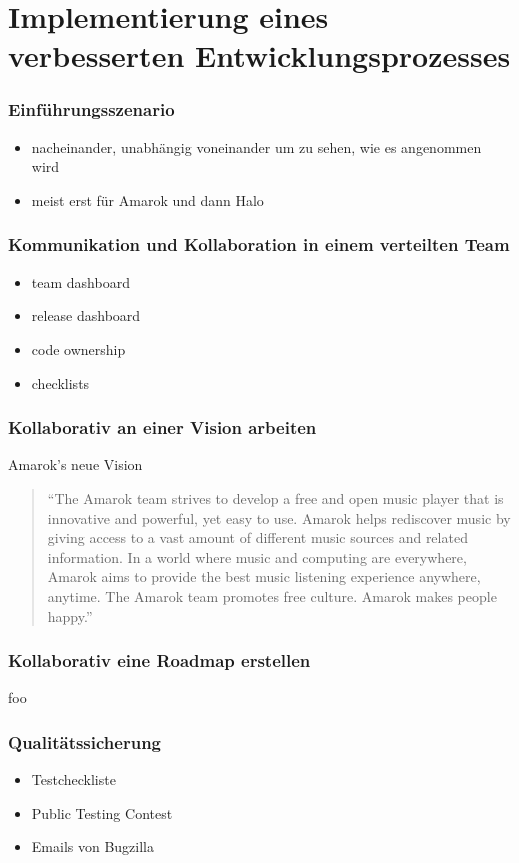 \documentclass{beamer}
\begin{document}
\section{Implementierung eines verbesserten Entwicklungsprozesses}

\begin{frame}
\frametitle{Einf\"uhrungsszenario}
\begin{itemize}
 \item nacheinander, unabh\"angig voneinander um zu sehen, wie es angenommen wird
 \item meist erst f\"ur Amarok und dann Halo
\end{itemize}
\end{frame}

\begin{frame}
\frametitle{Kommunikation und Kollaboration in einem verteilten Team}
\begin{itemize}
 \item team dashboard
 \item release dashboard
 \item code ownership
 \item checklists
\end{itemize}
\end{frame}

\begin{frame}
\frametitle{Kollaborativ an einer Vision arbeiten}
\begin{block}{Amarok's neue Vision}
\begin{quotation}``The Amarok team strives to develop a free and open music player that is innovative and powerful, yet easy to use. Amarok helps rediscover music by giving access to a vast amount of different music sources and related information. In a world where music and computing are everywhere, Amarok aims to provide the best music listening experience anywhere, anytime. The Amarok team promotes free culture. Amarok makes people happy.''\end{quotation}
\end{block}
\end{frame}

\begin{frame}
\frametitle{Kollaborativ eine Roadmap erstellen}
foo
\end{frame}

\begin{frame}
\frametitle{Qualit\"atssicherung}
\begin{itemize}
 \item Testcheckliste
 \item Public Testing Contest
 \item Emails von Bugzilla
\end{itemize}
\end{frame}
\end{document}
